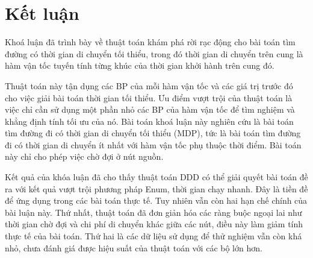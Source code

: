 \documentclass[../main.tex]{subfiles}
\begin{document}
\chapter*{Kết luận}\label{kux1ebft-luux1eadn}

Khoá luận đã trình bày về thuật toán khám phá rời rạc động cho bài toán tìm đường có thời gian di chuyển tối thiểu, trong đó thời gian di chuyển trên cung là hàm vận tốc tuyến tính từng khúc của thời gian khởi hành trên cung đó. 

Thuật toán này tận dụng các BP của mỗi hàm vận tốc và các giá trị trước đó cho việc giải bài toán thời gian tối thiểu. Ưu điểm vượt trội của thuật toán là việc chỉ cần sử dụng một phần nhỏ các BP của hàm vận tốc để tìm nghiệm và khẳng định tính tối ưu của nó. 
Bài toán khoá luận này nghiên cứu là bài toán tìm đường đi có thời gian di chuyển tối thiểu (MDP), tức là bài toán tìm đường đi có thời gian di chuyển ít nhất với hàm vận tốc phụ thuộc thời điểm. Bài toán này chỉ cho phép việc chờ đợi ở nút nguồn.

Kết quả của khóa luận đã cho thấy thuật toán DDD có thể giải quyết bài toán đề ra với kết quả vượt trội phương pháp Enum, thời gian chạy nhanh. Đây là tiền đề để ứng dụng trong các bài toán thực tế. 
Tuy nhiên vẫn còn hai hạn chế chính của bài luận này. 
Thứ nhất, thuật toán đã đơn giản hóa các ràng buộc ngoại lai như thời gian chờ đợi và chi phí di chuyển khác giữa các nút, điều này làm giảm tính thực tế của bài toán. 
Thứ hai là các dữ liệu sử dụng để thử nghiệm vẫn còn khá nhỏ, chưa đánh giá được hiệu suất của thuật toán với các bộ lớn hơn. 


\end{document}
